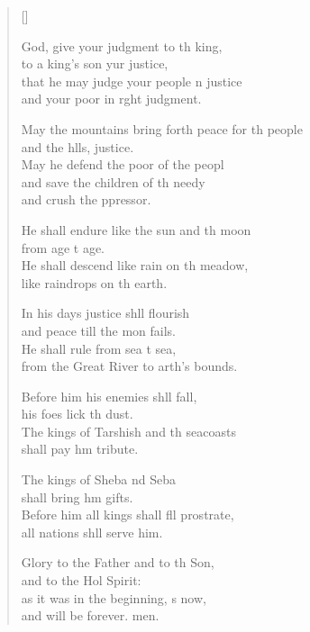 \settowidth{\versewidth}{May the mountains bring forth peace for the people *}
\begin{verse}[\versewidth]
  \begin{patverse}
 God, give your judgment to th king,\Med\\
to a king’s son yur justice,\\
that he may judge your people \pointup{\i}n justice\Med\\
and your poor in r\pointup{\i}ght judgment.

May the mountains bring forth peace for th people\Med\\
and the h\pointup{\i}lls, justice.\\
May he defend the poor of the peopl\Flex\\
and save the children of th needy\Med\\
and crush the ppressor.

He shall endure like the sun and th moon\Med\\
from age t age.\\
He shall descend like rain on th meadow,\Med\\
like raindrops on th earth.

In his days justice shll flourish\Med\\
and peace till the mon fails.\\
He shall rule from sea t sea,\Med\\
from the Great River to arth’s bounds.

Before him his enemies shll fall,\Med\\
his foes lick th dust.\\
The kings of Tarshish and th seacoasts\Med\\
shall pay h\pointup{\i}m tribute.

The kings of Sheba nd Seba\Med\\
shall bring h\pointup{\i}m gifts.\\
Before him all kings shall fll prostrate,\Med\\
all nations shll serve him.

Glory to the Father and to th Son,\Med\\
and to the Hol Spirit:\\
as it was in the beginning, \pointup{\i}s now,\Med\\
and will be forever. men.
  \end{patverse}
\end{verse}
